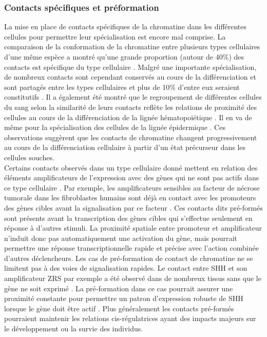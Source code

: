 \subsubsection{Contacts spécifiques et préformation}
\label{subsubsec:specifique-preformation}

La mise en place de contacts spécifiques de la chromatine dans les différentes cellules pour permettre leur spécialisation est encore mal comprise. La comparaison de la conformation de la chromatine entre plusieurs types cellulaires d’une même espèce a montré qu’une grande proportion (autour de 40\%) des contacts est spécifique du type cellulaire \citep{javierre_lineage-specific_2016}. Malgré une importante spécialisation, de nombreux contacts sont cependant conservés au cours de la différenciation et sont partagés entre les types cellulaires et plus de 10\% d'entre eux seraient constitutifs  \citep{freire-pritchett_global_2017, rubin_lineage-specific_2017}. Il a également été montré que le regroupement de différentes cellules du sang selon la similarité de leurs contacts reflète les relations de proximité des cellules au cours de la différenciation de la lignée hématopoïétique \citep{javierre_lineage-specific_2016}. Il en va de même pour la spécialisation des cellules de la lignée épidermique \citep{rubin_lineage-specific_2017}. Ces observations suggèrent que les contacts de chromatine changent progressivement au cours de la différenciation cellulaire à partir d'un état précurseur dans les cellules souches. \\

Certains contacts observés dans un type cellulaire donné mettent en relation des éléments \glspl{amplificateur} de l’expression avec des gènes qui ne sont pas actifs dans ce type cellulaire \citep{schoenfelder_pluripotent_2015}. Par exemple, les \glspl{amplificateur} sensibles au facteur de nécrose tumorale dans les fibroblastes humains sont déjà en contact avec les promoteurs des gènes cibles avant la signalisation par ce facteur \citep{jin_high-resolution_2013}. Ces contacts dits pré-formés sont présents avant la transcription des gènes cibles qui s’effectue seulement en réponse à d’autres stimuli. La proximité spatiale entre promoteur et \gls{amplificateur} n’induit donc pas automatiquement une activation du gène, mais pourrait permettre une réponse transcriptionnelle rapide et précise avec l’action combinée d’autres déclencheurs. Les cas de pré-formation de contact de chromatine ne se limitent pas à des voies de signalisation rapides. Le contact entre \acrshort{SHH} et son \gls{amplificateur} \acrshort{ZRS} par exemple a été observé dans de nombreux tissus sans que le gène ne soit exprimé \citep{amano_chromosomal_2009, williamson_shh_2016, ron_promoter-enhancer_2017}. La pré-formation dans ce cas pourrait assurer une proximité constante pour permettre un patron d’expression robuste de \acrshort{SHH} lorsque le gène doit être actif \citep{paliou_preformed_2019}. Plus généralement les contacts pré-formés pourraient maintenir les relations \gls{cis}-régulatrices ayant des impacts majeurs sur le développement ou la survie des individus. 

